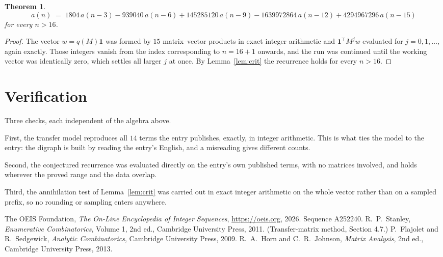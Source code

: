 \documentclass[11pt,a4paper]{article}
\theoremstyle{plain}
\newtheorem{theorem}{Theorem}
\theoremstyle{definition}
\begin{document}
\begin{theorem}
\[
a(n)\;=\;1804\,a(n-3) - 939040\,a(n-6) + 145285120\,a(n-9) - 1639972864\,a(n-12) + 4294967296\,a(n-15)
\]
for every $n>16$.
\end{theorem}

\begin{proof}
The vector $w=q(M)\mathbf{1}$ was formed by $15$ matrix--vector products in exact
integer arithmetic and $\mathbf{1}^{\!\top}M^{j}w$ evaluated for $j=0,1,\dots$, again
exactly. Those integers vanish from the index corresponding to $n=16+1$ onwards, and the
run was continued until the working vector was identically zero, which settles all larger $j$
at once. By Lemma~\ref{lem:crit} the recurrence holds for every $n>16$.
\end{proof}

\section{Verification}

Three checks, each independent of the algebra above.

First, the transfer model reproduces all $14$ terms the entry publishes, exactly, in
integer arithmetic. This is what ties the model to the entry: the digraph is built by reading
the entry's English, and a misreading gives different counts.

Second, the conjectured recurrence was evaluated directly on the entry's own published terms,
with no matrices involved, and holds wherever the proved range and the data overlap.

Third, the annihilation test of Lemma~\ref{lem:crit} was carried out in exact integer
arithmetic on the whole vector rather than on a sampled prefix, so no rounding or sampling
enters anywhere.

\begin{thebibliography}{9}
 The OEIS Foundation, \emph{The On-Line Encyclopedia of Integer
Sequences}, \url{https://oeis.org}, 2026. Sequence A252240.
 R.~P.~Stanley, \emph{Enumerative Combinatorics}, Volume 1, 2nd ed.,
Cambridge University Press, 2011. (Transfer-matrix method, Section 4.7.)
 P.~Flajolet and R.~Sedgewick, \emph{Analytic Combinatorics}, Cambridge
University Press, 2009.
 R.~A.~Horn and C.~R.~Johnson, \emph{Matrix Analysis}, 2nd ed., Cambridge
University Press, 2013.
\end{thebibliography}
\end{document}
